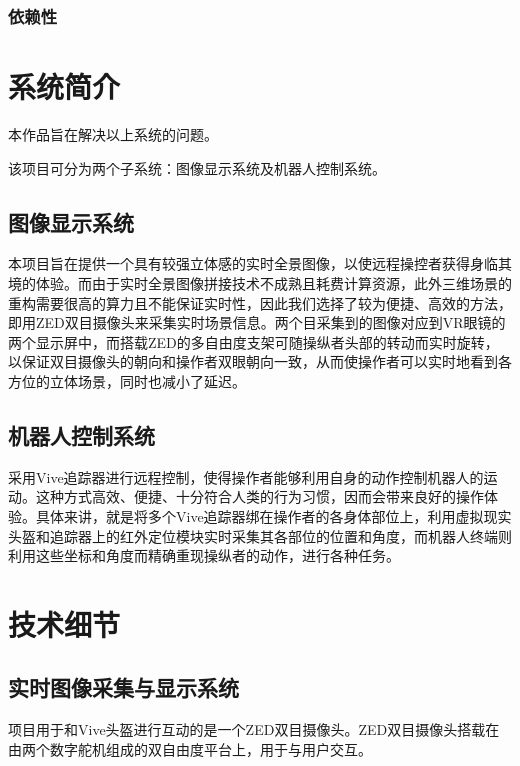 \subsection{依赖性}

\subsection{}


\chapter{系统简介}
本作品旨在解决以上系统的问题。

	该项目可分为两个子系统：图像显示系统及机器人控制系统。
	\section{图像显示系统}
	本项目旨在提供一个具有较强立体感的实时全景图像，以使远程操控者获得身临其境的体验。而由于实时全景图像拼接技术不成熟且耗费计算资源，此外三维场景的重构需要很高的算力且不能保证实时性，因此我们选择了较为便捷、高效的方法，即用ZED双目摄像头来采集实时场景信息。两个目采集到的图像对应到VR眼镜的两个显示屏中，而搭载ZED的多自由度支架可随操纵者头部的转动而实时旋转，以保证双目摄像头的朝向和操作者双眼朝向一致，从而使操作者可以实时地看到各方位的立体场景，同时也减小了延迟。
	\section{机器人控制系统}
	采用Vive追踪器进行远程控制，使得操作者能够利用自身的动作控制机器人的运动。这种方式高效、便捷、十分符合人类的行为习惯，因而会带来良好的操作体验。具体来讲，就是将多个Vive追踪器绑在操作者的各身体部位上，利用虚拟现实头盔和追踪器上的红外定位模块实时采集其各部位的位置和角度，而机器人终端则利用这些坐标和角度而精确重现操纵者的动作，进行各种任务。





\chapter{技术细节}

\section{实时图像采集与显示系统}
项目用于和Vive头盔进行互动的是一个ZED双目摄像头。ZED双目摄像头搭载在由两个数字舵机组成的双自由度平台上，用于与用户交互。

